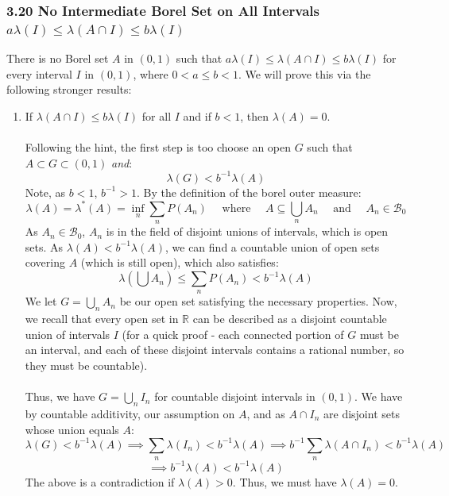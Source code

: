 \documentclass[12pt,a4paper]{article}
\newcommand{\1}[1]{\mathbbm{1}\left\{ #1 \right\}}
\newcommand{\R}{\mathbb{R}}
\newcommand{\bcal}{\mathcal{B}}
\begin{document}
\subsubsection{3.20 No Intermediate Borel Set on All Intervals $a\lambda(I) \leq \lambda(A \cap I) \leq b\lambda(I)$} There is no Borel set $A$ in $(0,1)$ such that $a\lambda(I) \leq \lambda(A \cap I) \leq b\lambda(I)$ for every interval $I$ in $(0,1)$, where $0 < a \leq b < 1$. We will prove this via the following stronger results:
\begin{enumerate}
	\item If $\lambda(A \cap I) \leq b\lambda(I)$ for all $I$ and if $b < 1$, then $\lambda(A) = 0$.
	\\\\
	Following the hint, the first step is too choose an open $G$ such that $A \subset G \subset (0,1)$ \textit{and}:
	$$
		\lambda(G) < b^{-1}\lambda(A)
	$$
	Note, as $b < 1$, $b^{-1} > 1$. By the definition of the borel outer measure:
	$$
		\lambda(A) = \lambda^*(A) = \inf_n \sum_n P(A_n) \quad\text{ where }\quad
		A \subseteq \bigcup_n A_n \quad\text{ and }\quad A_n \in \bcal_0
	$$
	As $A_n \in \bcal_0$, $A_n$ is in the field of disjoint unions of intervals, which is open sets. As $\lambda(A) < b^{-1}\lambda(A)$, we can find a countable union of open sets covering $A$ (which is still open), which also satisfies:
	$$
		\lambda(\bigcup A_n) \leq \sum_n P(A_n) < b^{-1}\lambda(A)
	$$
	We let $G = \bigcup_n A_n$ be our open set satisfying the necessary properties. Now, we recall that every open set in $\R$ can be described as a disjoint countable union of intervals $I$ (for a quick proof - each connected portion of $G$ must be an interval, and each of these disjoint intervals contains a rational number, so they must be countable).
	\\\\
	Thus, we have $G = \bigcup_n I_n$ for countable disjoint intervals in $(0,1)$. We have by countable additivity, our assumption on $A$, and as $A \cap I_n$ are disjoint sets whose union equals $A$:
	$$
		\lambda(G) < b^{-1}\lambda(A) \implies
		\sum_n \lambda(I_n) < b^{-1}\lambda(A) \implies
		b^{-1} \sum_n \lambda(A \cap I_n) < b^{-1}\lambda(A)
	$$
	$$
		\implies b^{-1} \lambda(A) < b^{-1} \lambda(A)
	$$
	The above is a contradiction if $\lambda(A) > 0$. Thus, we must have $\lambda(A) = 0$.
	

\end{enumerate}
\end{document}
